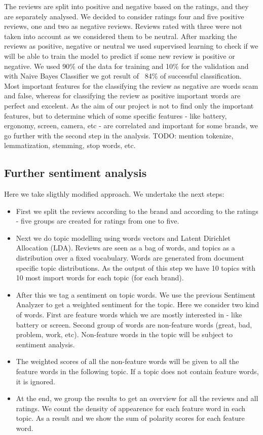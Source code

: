 \documentclass[11pt]{article}
\begin{document}
The reviews are split into positive and negative based on the ratings, and they are separately analysed. We decided to consider ratings four and five positive reviews, one and two as negative reviews. Reviews rated with three were not taken into account as we considered them to be neutral. After marking the reviews as positive, negative or neutral we used supervised learning to check if we will be able to train the model to predict if some new review is positive or negative. We used 90\% of the data for training and 10\% for the validation and with Naive Bayes Classifier we got result of ~84\% of successful classification. Most important features for the classifying the review as negative are words scam and false, whereas for classifying the review as positive important words are perfect and excelent. As the aim of our project is not to find only the important features, but to determine which of some specific features - like battery, ergonomy, screen, camera, etc - are correlated and important for some brands, we go further with the second step in the analysis. 
TODO: mention tokenize, lemmatization, stemming, stop words, etc. 


\subsection{Further sentiment analysis} 

Here we take sligthly modified approach. We undertake the next steps: 

 \begin{itemize}
  \item First we split the reviews according to the brand and according to the ratings - five groups are created for ratings from one to five.
  \item Next we do topic modelling using words vectors and Latent Dirichlet Allocation (LDA). Reviews are seen as a bag of words, and topics as a distribution over a fixed vocabulary. Words are generated from document specific topic distributions. As the output of this step we have 10 topics with 10 most import words for each topic (for each brand).
  \item After this we tag a sentiment on topic words. We use the previous Sentiment Analyzer to get a weighted sentiment for the topic. Here we consider two kind of words. First are feature words which we are mostly interested in - like battery or screen. Second group of words are non-feature words (great, bad, problem, work, etc). Non-feature words in the topic will be subject to sentiment analysis. 
  \item The weighted scores of all the non-feature words will be given to all the feature words in the following topic. If a topic does not contain feature words, it is ignored.
  \item At the end, we group the results to get an overview for all the reviews and all ratings. We count the density of appearence for each feature word in each topic. As a result and we show the sum of polarity scores for each feature word.
\end{itemize}
\end{document}

